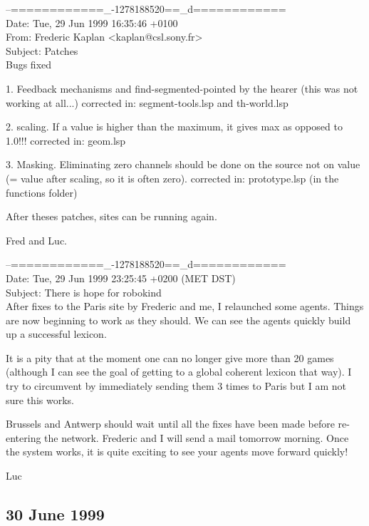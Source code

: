 \begin{mail}
--============\_-1278188520==\_d============\\
Date: Tue, 29 Jun 1999 16:35:46 +0100\\
From: Frederic Kaplan <kaplan@csl.sony.fr>\\
Subject: Patches\\

Bugs fixed

1. Feedback mechanisms and find-segmented-pointed by the hearer (this
was not working at all...) corrected in: segment-tools.lsp and th-world.lsp

2. scaling. If a value is higher than the maximum, it gives max as opposed to
1.0!!! corrected in: geom.lsp

3. Masking. Eliminating zero channels should be done on the source not on
value (= value after scaling, so it is often zero). corrected in: 
prototype.lsp (in the functions folder)

After theses patches, sites can be running again.

Fred and Luc.
\end{mail}
\clearpage
\begin{mail}
--============\_-1278188520==\_d============\\
Date: Tue, 29 Jun 1999 23:25:45 +0200 (MET DST)\\
Subject: There is hope for robokind \\

After fixes to the Paris site by Frederic and me, I relaunched some agents. 
Things are now beginning to work as they should. We can see the
agents quickly build up a successful lexicon.

It is a pity that at the moment one can no longer give more 
than 20 games (although I can see the goal of getting to a global 
coherent lexicon that way). I try to circumvent by immediately
sending them 3 times to Paris but I am not sure this works.

Brussels and Antwerp should wait until all the fixes have been made 
before re-entering the network. Frederic and I will send a mail tomorrow
morning. Once the system works, it is quite exciting to see your agents move 
forward quickly!

Luc
\end{mail}

\subsection*{30 June 1999} 


